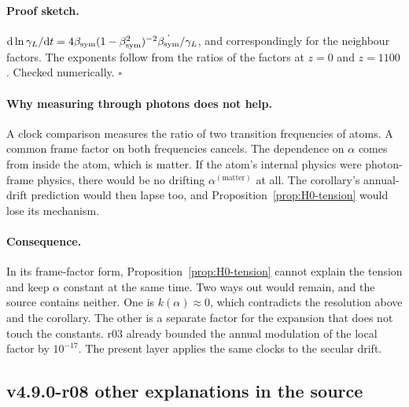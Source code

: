 \paragraph{Proof sketch.}
\({\rm d}\ln\gamma_L/{\rm d}t=4\beta_{\mathrm{sym}}(1-\beta_{\mathrm{sym}}^2)^{-2}\dot{\beta_{\mathrm{sym}}}/\gamma_L\), and correspondingly for the neighbour factors.  The
exponents follow from the ratios of the factors at \(z=0\) and \(z=1100\).  Checked numerically.  \(\square\)

\paragraph{Why measuring through photons does not help.}
A clock comparison measures the ratio of two transition frequencies of atoms.  A common frame factor on both frequencies
cancels.  The dependence on \(\alpha\) comes from inside the atom, which is matter.  If the atom's internal physics were
photon-frame physics, there would be no drifting \(\alpha^{(\mathrm{matter})}\) at all.  The corollary's annual-drift
prediction would then lapse too, and Proposition~\ref{prop:H0-tension} would lose its mechanism.

\paragraph{Consequence.}
In its frame-factor form, Proposition~\ref{prop:H0-tension} cannot explain the tension and keep \(\alpha\) constant at the
same time.  Two ways out would remain, and the source contains neither.  One is \(k(\alpha)\approx0\), which contradicts the
resolution above and the corollary.  The other is a separate factor for the expansion that does not touch the
constants.  r03 already bounded the annual modulation of the local factor by \(10^{-17}\).  The present layer applies the
same clocks to the secular drift.

\subsection*{v4.9.0-r08 other explanations in the source}
\label{subsec:v490-r08-other}

